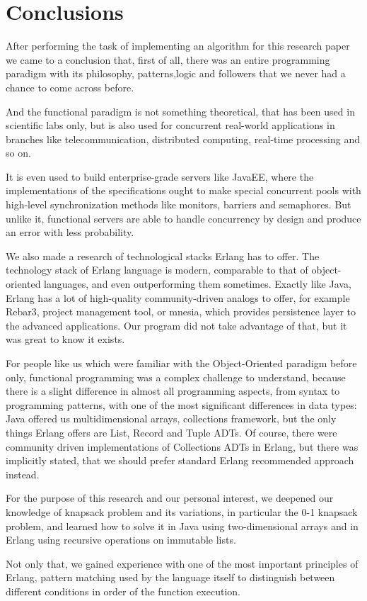 \section{Conclusions}

After performing the task of implementing an algorithm for this 
research paper we came to a conclusion that, first of all, there 
was an entire programming paradigm with its philosophy, patterns,logic and followers 
that we never had a chance to come across before. 

And the functional paradigm is not something theoretical,
that has been used in scientific labs only, but is also used for 
concurrent real-world applications in branches like telecommunication, 
distributed computing, real-time processing and so on.

It is even used to build enterprise-grade servers like JavaEE, 
where the implementations of the specifications 
ought to make special concurrent pools 
with high-level synchronization methods like monitors,
barriers and semaphores. 
But unlike it, functional servers are able to handle 
concurrency by design and produce an error with less probability.

We also made a research of technological stacks Erlang has to offer.
The technology stack of Erlang language is modern, comparable to that of object-oriented
languages, and even outperforming them sometimes. 
Exactly like Java, Erlang has a lot of high-quality community-driven analogs to offer,
for example Rebar3, 
project management tool, 
or mnesia, which provides persistence layer to the advanced applications.
Our program did not take advantage of that, but it was great to know it exists.

For people like us which were familiar with the Object-Oriented paradigm before only,
functional programming was a complex challenge to understand, 
because there is a slight difference in almost all programming aspects,
from syntax to programming patterns,
with one of the most significant differences in data types: 
Java offered us multidimensional arrays,
collections framework, 
but the only things Erlang offers are List, Record and Tuple ADTs.
Of course, there were community driven 
implementations of Collections ADTs in Erlang, 
but there was implicitly stated, that we should 
prefer standard Erlang recommended approach instead.

For the purpose of this research and our personal interest, 
we deepened our knowledge of knapsack problem and its variations,
in particular the 0-1 knapsack problem, and learned how to solve it in Java
using two-dimensional arrays and in Erlang using recursive operations on immutable lists.
  
Not only that, we gained experience with one of the most important principles of Erlang, 
pattern matching used by the language itself to distinguish between different conditions
in order of the function execution.